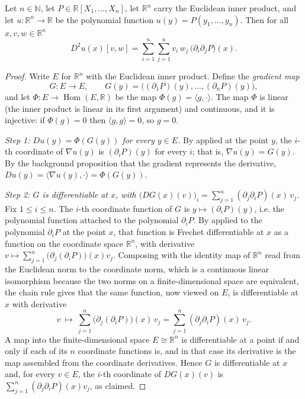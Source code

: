 \begin{lemma}
Let $n\in\mathbb{N}$, let $P\in\mathbb{R}[X_1,\dots,X_n]$, let $\mathbb{R}^n$
carry the Euclidean inner product, and let $u:\mathbb{R}^n\to\mathbb{R}$ be the
polynomial function $u(y)=P(y_1,\dots,y_n)$. Then for all
$x,v,w\in\mathbb{R}^n$
\[
  D^2u(x)[v,w]
  =\sum_{i=1}^{n}\sum_{j=1}^{n}v_i\,w_j\,\bigl(\partial_i\partial_jP\bigr)(x).
\]
\end{lemma}
\begin{proof}
Write $E$ for $\mathbb{R}^n$ with the Euclidean inner product. Define the
\emph{gradient map}
\[
  G:E\to E,\qquad
  G(y)=\bigl((\partial_1P)(y),\dots,(\partial_nP)(y)\bigr),
\]
and let $\Phi:E\to\operatorname{Hom}(E,\mathbb{R})$ be the map
$\Phi(g)=\langle g,\cdot\rangle$. The map $\Phi$ is linear (the inner product is
linear in its first argument) and continuous, and it is injective: if
$\Phi(g)=0$ then $\langle g,g\rangle=0$, so $g=0$.

\emph{Step 1: $Du(y)=\Phi(G(y))$ for every $y\in E$.} By
 applied at the point $y$, the $i$-th coordinate of
$\nabla u(y)$ is $(\partial_iP)(y)$ for every $i$; that is, $\nabla u(y)=G(y)$.
By the background proposition that the gradient represents the derivative,
$Du(y)=\langle\nabla u(y),\cdot\rangle=\Phi(G(y))$.

\emph{Step 2: $G$ is differentiable at $x$, with
$\bigl(DG(x)(v)\bigr)_i=\sum_{j=1}^{n}(\partial_j\partial_iP)(x)\,v_j$.} Fix
$1\le i\le n$. The $i$-th coordinate function of $G$ is $y\mapsto(\partial_iP)(y)$,
i.e. the polynomial function attached to the polynomial $\partial_iP$. By
 applied to the polynomial $\partial_iP$ at the point $x$,
that function is Frechet differentiable at $x$ as a function on the coordinate
space $\mathbb{R}^n$, with derivative
$v\mapsto\sum_{j=1}^{n}\bigl(\partial_j(\partial_iP)\bigr)(x)v_j$. Composing with
the identity map of $\mathbb{R}^n$ read from the Euclidean norm to the coordinate
norm, which is a continuous linear isomorphism because the two norms on a
finite-dimensional space are equivalent, the chain rule gives that the same
function, now viewed on $E$, is differentiable at $x$ with derivative
\[
  v\ \longmapsto\ \sum_{j=1}^{n}\bigl(\partial_j(\partial_iP)\bigr)(x)\,v_j
  =\sum_{j=1}^{n}(\partial_j\partial_iP)(x)\,v_j .
\]
A map into the finite-dimensional space $E\cong\mathbb{R}^n$ is differentiable at
a point if and only if each of its $n$ coordinate functions is, and in that case
its derivative is the map assembled from the coordinate derivatives. Hence $G$ is
differentiable at $x$ and, for every $v\in E$, the $i$-th coordinate of
$DG(x)(v)$ is $\sum_{j=1}^{n}(\partial_j\partial_iP)(x)v_j$, as claimed.


\end{proof}
